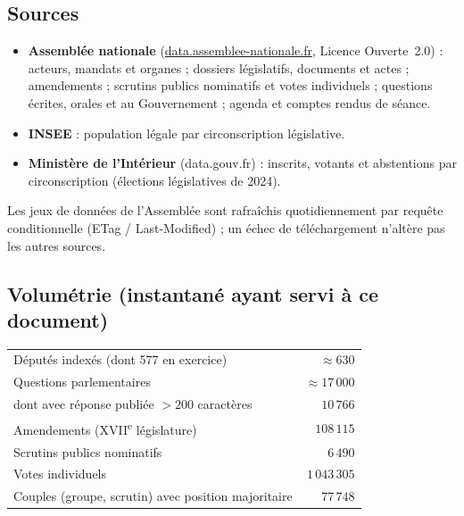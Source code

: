 \documentclass[11pt,a4paper]{article}
\begin{document}
\subsection{Sources}
\begin{itemize}
  \item \textbf{Assemblée nationale} (\href{https://data.assemblee-nationale.fr}{data.assemblee-nationale.fr},
        Licence Ouverte~2.0) : acteurs, mandats et organes ; dossiers législatifs,
        documents et actes ; amendements ; scrutins publics nominatifs et votes
        individuels ; questions écrites, orales et au Gouvernement ; agenda et
        comptes rendus de séance.
  \item \textbf{INSEE} : population légale par circonscription législative.
  \item \textbf{Ministère de l'Intérieur} (data.gouv.fr) : inscrits, votants et
        abstentions par circonscription (élections législatives de 2024).
\end{itemize}
Les jeux de données de l'Assemblée sont rafraîchis quotidiennement par requête
conditionnelle (ETag / Last-Modified) ; un échec de téléchargement n'altère pas
les autres sources.

\subsection{Volumétrie (instantané ayant servi à ce document)}
\begin{center}\small
\begin{tabular}{@{}lr@{}}
\toprule
Députés indexés (dont 577 en exercice) & $\approx 630$ \\
Questions parlementaires & $\approx 17\,000$ \\
\quad dont avec réponse publiée $>200$ caractères & $10\,766$ \\
Amendements (XVII\textsuperscript{e} législature) & $108\,115$ \\
Scrutins publics nominatifs & $6\,490$ \\
Votes individuels & $1\,043\,305$ \\
Couples (groupe, scrutin) avec position majoritaire & $77\,748$ \\
\bottomrule
\end{tabular}
\end{center}
\end{document}
